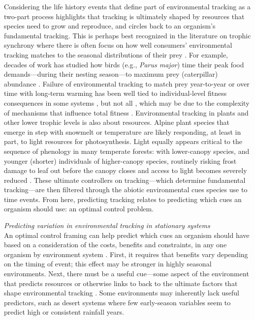 \documentclass[11pt,letterpaper]{article}
\begin{document}
Considering the life history events that define part of environmental tracking as a two-part process highlights that tracking is ultimately shaped by resources that species need to grow and reproduce, and circles back to an organism's fundamental tracking. This is perhaps best recognized in the literature on trophic synchrony where there is often focus on how well consumers' environmental tracking matches to the seasonal distributions of their prey \citep{deacy2018,kharouba2018}. For example, decades of work has studied how birds (e.g., \emph{Parus major}) time their peak food demands---during their nesting season---to maximum prey (caterpillar) abundance \citep[e.g.,][]{charm2008}. Failure of environmental tracking to match prey year-to-year or over time with long-term warming has been well tied to individual-level fitness consequences in some systems \citep{charm2008}, but not all \citep{visser2006}, which may be due to the complexity of mechanisms that influence total fitness \citep{Singer:2010eb,Johansson2012}. Environmental tracking in plants and other lower trophic levels is also about resources. Alpine plant species that emerge in step with snowmelt or temperature are likely responding, at least in part, to light resources for photosynthesis. Light equally appears critical to the sequence of phenology in many temperate forests: with lower-canopy species, and younger (shorter) individuals of higher-canopy species, routinely risking frost damage to leaf out before the canopy closes and access to light becomes severely reduced \citep{Vitasse2013,heberling2019}. These ultimate controllers on tracking---which determine fundamental tracking---are then filtered through the abiotic environmental cues species use to time events. From here, predicting tracking relates to predicting which cues an organism should use: an optimal control problem. %

\emph{Predicting variation in environmental tracking in stationary systems}\\
An optimal control framing can help predict which cues an organism should have based on a consideration of the costs, benefits and constraints, in any one organism by environment system \citep{donahue2015}. First, it requires that benefits vary depending on the timing of event; this effect may be stronger in highly seasonal environments. Next, there must be a useful cue---some aspect of the environment that predicts resources or otherwise links to back to the ultimate factors that shape environmental tracking \citep{gremer2016}. Some environments may inherently lack useful predictors, such as desert systems where few early-season variables seem to predict high or consistent rainfall years. 
\end{document}
